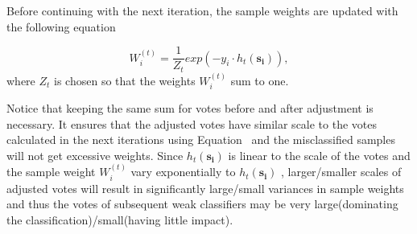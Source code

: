 Before continuing with the next iteration, the sample weights are updated with the following equation

\begin{equation} \label{equ:weight_update}
W_i^{(t)} = \frac{1}{Z_t}exp(-y_i \cdot h_t(\boldsymbol{s_i})), %
\end{equation}
where $Z_t$ is chosen so that the weights $W_i^{(t)}$ sum to one.

Notice that keeping the same sum for votes before and after adjustment is necessary. It ensures that the adjusted votes have similar scale to the votes calculated in the next iterations using Equation~%
and the misclassified samples will not get excessive weights. Since $h_t(\boldsymbol{s_i})$ is linear to the scale of the votes and the sample weight $W_i^{(t)}$ vary exponentially to $h_t(\boldsymbol{s_i})$%
, larger/smaller scales of adjusted votes will result in significantly large/small variances in sample weights and thus the votes of subsequent weak classifiers may be very large(dominating the classification)/small(having little impact).

